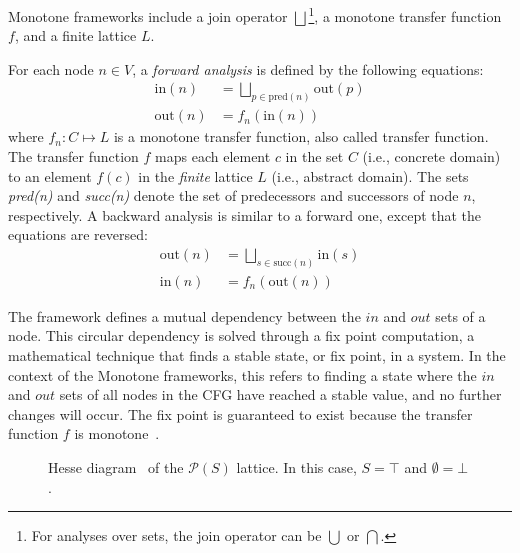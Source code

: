 Monotone frameworks include a join operator $\bigsqcup$\footnote{
  For analyses over sets, the join operator can be $\bigcup$ or $\bigcap$.
}, a monotone transfer function $f$,
and a finite lattice $L$.


For each node $n \in V$, a \emph{forward analysis} is defined by the following equations:
\begin{align*}
  \text{in}(n) &= \bigsqcup\limits_{p \in \text{pred}(n)} \text{out}(p) \\
  \text{out}(n) &= f_n(\text{in}(n))
\end{align*}
where $f_n:C \mapsto L$ is a monotone transfer function, also called transfer function.
The transfer function $f$ maps each element $c$ in the set $C$ (i.e., concrete domain)
to an element $f(c)$ in the \emph{finite} lattice $L$ (i.e., abstract domain). The sets \emph{pred(n)} and \emph{succ(n)}
denote the set of predecessors and successors of node $n$, respectively.
A backward analysis is similar to a forward one, except that the equations are reversed:
\begin{align*}
  \text{out}(n) &= \bigsqcup\limits_{s \in \text{succ}(n)} \text{in}(s) \\
  \text{in}(n) &= f_n(\text{out}(n))
\end{align*}

The framework defines a mutual dependency between the $in$ and $out$ sets of a node.
This circular dependency is solved through a fix point computation,
a mathematical technique that finds a stable state, or fix point, in a system.
In the context of the Monotone frameworks, this
refers to finding a state where the $in$ and $out$ sets of all nodes in the CFG have reached a
stable value, and no further changes will occur. The fix point is guaranteed to exist
because the transfer function $f$ is monotone~\cite{Knaster1929}.


\begin{figure}[h]
    \centering
{}
  \caption{\label{fig:lattice}Hesse diagram~\cite{Hesse1874} of the $\mathcal{P}(S)$ lattice.
  In this case, $S = \top$ and $\emptyset = \bot$.}
\end{figure}

